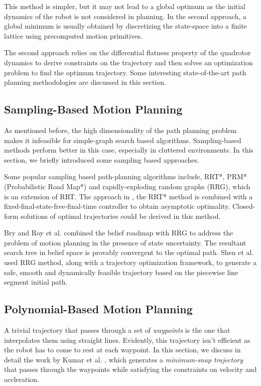 This method is simpler, but it may not lead to a global optimum as the initial dynamics of the robot is not considered in planning. In the second approach, a global minimum is usually obtained by discretizing the state-space into a finite lattice using precomputed motion primitives. 

The second approach relies on the differential flatness \cite{mellinger2011minimum} property of the quadrotor dynamics to derive constraints on the trajectory and then solves an optimization problem to find the optimum trajectory. Some interesting state-of-the-art path planning methodologies are discussed in this section. 

\subsection{Sampling-Based Motion Planning}
\label{sec:sampling_planning}
As mentioned before, the high dimensionality of the path planning problem makes it infeasible for simple-graph search based algorithms. Sampling-based methods perform better in this case, especially in cluttered environments. In this section, we briefly introduced some sampling based approaches. 

Some popular sampling based path-planning algorithms include, RRT*, PRM* (Probabilistic Road Map*) and rapidly-exploding random graphs (RRG), which is an extension of RRT. The approach in \cite{webb2013kinodynamic}, the RRT* method is combined with a fixed-final-state-free-final-time controller to obtain asymptotic optimality. Closed-form solutions of optimal trajectories could be derived in this method. 

Bry and Roy et al. \cite{bry2011rapidly} combined the belief roadmap with RRG to address the problem of motion planning in the presence of state uncertainty. The resultant search tree in belief space is provably convergent to the optimal path. Shen et al. \cite{shen2017gradient} used RRG method, along with a trajectory optimization framework, to generate a safe, smooth and dynamically feasible trajectory based on the piecewise line segment initial path. 

\subsection{Polynomial-Based Motion Planning}
\label{sec:poly_based_planning}
A trivial trajectory that passes through a set of \textit{waypoints} is the one that interpolates them using straight lines. Evidently, this trajectory isn't efficient as the robot has to come to rest at each waypoint. In this section, we discuss in detail the work by Kumar et al. \cite{mellinger2011minimum}, which generates a \textit{minimum-snap trajectory} that passes through the waypoints while satisfying the constraints on velocity and accleration. 


